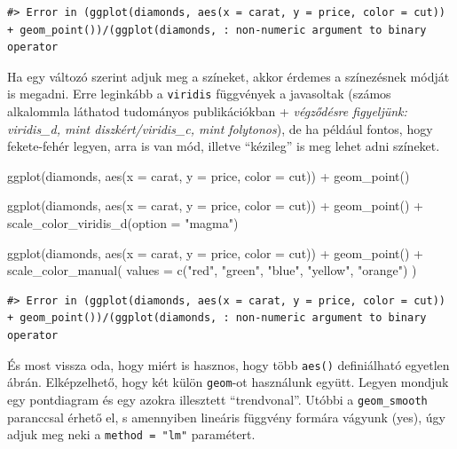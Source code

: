 \documentclass[
]{article}
\newenvironment{Shaded}{\begin{snugshade}}{\end{snugshade}}
\newcommand{\AttributeTok}[1]{\textcolor[rgb]{0.77,0.63,0.00}{#1}}
\newcommand{\FunctionTok}[1]{\textcolor[rgb]{0.00,0.00,0.00}{#1}}
\newcommand{\NormalTok}[1]{#1}
\newcommand{\SpecialCharTok}[1]{\textcolor[rgb]{0.00,0.00,0.00}{#1}}
\newcommand{\StringTok}[1]{\textcolor[rgb]{0.31,0.60,0.02}{#1}}
\begin{document}
\begin{verbatim}
#> Error in (ggplot(diamonds, aes(x = carat, y = price, color = cut)) + geom_point())/(ggplot(diamonds, : non-numeric argument to binary operator
\end{verbatim}

Ha egy változó szerint adjuk meg a színeket, akkor érdemes a színezésnek módját is megadni. Erre leginkább a \texttt{viridis} függvények a javasoltak (számos alkalommla láthatod tudományos publikációkban + \emph{végződésre figyeljünk: viridis\_d, mint diszkért/viridis\_c, mint folytonos}), de ha például fontos, hogy fekete-fehér legyen, arra is van mód, illetve ``kézileg'' is meg lehet adni színeket.

\begin{Shaded}
\begin{Highlighting}[]
\FunctionTok{ggplot}\NormalTok{(diamonds, }\FunctionTok{aes}\NormalTok{(}\AttributeTok{x =}\NormalTok{ carat, }\AttributeTok{y =}\NormalTok{ price, }\AttributeTok{color =}\NormalTok{ cut)) }\SpecialCharTok{+}
  \FunctionTok{geom\_point}\NormalTok{()}

\FunctionTok{ggplot}\NormalTok{(diamonds, }\FunctionTok{aes}\NormalTok{(}\AttributeTok{x =}\NormalTok{ carat, }\AttributeTok{y =}\NormalTok{ price, }\AttributeTok{color =}\NormalTok{ cut)) }\SpecialCharTok{+}
  \FunctionTok{geom\_point}\NormalTok{() }\SpecialCharTok{+}
  \FunctionTok{scale\_color\_viridis\_d}\NormalTok{(}\AttributeTok{option =} \StringTok{"magma"}\NormalTok{)}

\FunctionTok{ggplot}\NormalTok{(diamonds, }\FunctionTok{aes}\NormalTok{(}\AttributeTok{x =}\NormalTok{ carat, }\AttributeTok{y =}\NormalTok{ price, }\AttributeTok{color =}\NormalTok{ cut)) }\SpecialCharTok{+}
  \FunctionTok{geom\_point}\NormalTok{() }\SpecialCharTok{+} 
  \FunctionTok{scale\_color\_manual}\NormalTok{(}
    \AttributeTok{values =} \FunctionTok{c}\NormalTok{(}\StringTok{"red"}\NormalTok{, }\StringTok{"green"}\NormalTok{, }\StringTok{"blue"}\NormalTok{, }\StringTok{"yellow"}\NormalTok{, }\StringTok{"orange"}\NormalTok{)}
\NormalTok{    )}
\end{Highlighting}
\end{Shaded}

\begin{verbatim}
#> Error in (ggplot(diamonds, aes(x = carat, y = price, color = cut)) + geom_point())/(ggplot(diamonds, : non-numeric argument to binary operator
\end{verbatim}

És most vissza oda, hogy miért is hasznos, hogy több \texttt{aes()} definiálható egyetlen ábrán. Elképzelhető, hogy két külön \texttt{geom}-ot használunk együtt. Legyen mondjuk egy pontdiagram és egy azokra illesztett ``trendvonal''. Utóbbi a \texttt{geom\_smooth} paranccsal érhető el, s amennyiben lineáris függvény formára vágyunk (yes), úgy adjuk meg neki a \texttt{method\ =\ "lm"} paramétert.
\end{document}
